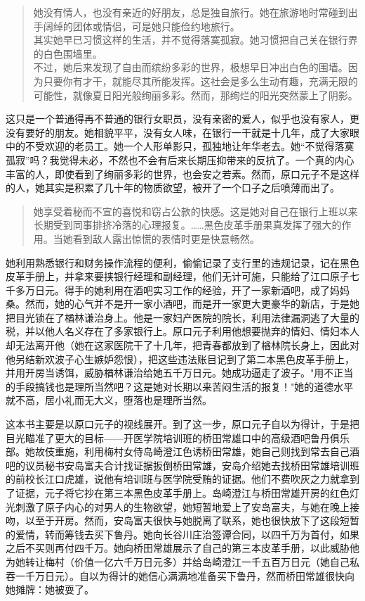\begin{quotation}
她没有情人，也没有亲近的好朋友，总是独自旅行。她在旅游地时常碰到出手阔绰的团体或情侣，可是她只能俭约地旅行。\\
其实她早已习惯这样的生活，并不觉得落寞孤寂。她习惯把自己关在银行界的白色围墙里。\\
不过，她后来发现了自由而缤纷多彩的世界，极想早日冲出白色的围墙。因为只要你有才干，就能尽其所能发挥。这社会是多么生动有趣，充满无限的可能性，就像夏日阳光般绚丽多彩。然而，那绚烂的阳光突然蒙上了阴影。
\end{quotation}

这只是一个普通得再不普通的银行女职员，没有亲密的爱人，似乎也没有家人，更没有要好的朋友。她相貌平平，没有女人味，在银行一干就是十几年，成了大家眼中的不受欢迎的老员工。她一个人形单影只，孤独地让年华老去。她“不觉得落寞孤寂”吗？我觉得未必，不然也不会有后来长期压抑带来的反抗了。一个真的内心丰富的人，即使看到了绚丽多彩的世界，也会安之若素。然而，原口元子不是这样的人，她其实是积累了几十年的物质欲望，被开了一个口子之后喷薄而出了。

\begin{quotation}
她享受着秘而不宣的喜悦和窃占公款的快感。这是她对自己在银行上班以来长期受到同事排挤冷落的心理报复。……黑色皮革手册果真发挥了强大的作用。当她看到敌人露出惊慌的表情时更是快意畅然。
\end{quotation}

她利用熟悉银行和财务操作流程的便利，偷偷记录了支行里的违规记录，记在黑色皮革手册上，并拿来要挟银行经理和副经理，他们无计可施，只能给了江口原子七千多万日元。得手的她利用在酒吧实习工作的经验，开了一家新酒吧，成了妈妈桑。然而，她的心气并不是开一家小酒吧，而是开一家更大更豪华的新店，于是她把目光锁在了楢林谦治身上。他是一家妇产医院的院长，利用法律漏洞逃了大量的税，并以他人名义存在了多家银行上。原口元子利用他想要抛弃的情妇、情妇本人却无法离开他（她在这家医院干了十几年，把青春都放到了楢林院长身上，因此对他另结新欢波子心生嫉妒怨恨），把这些违法账目记到了第二本黑色皮革手册上，并用开房当诱饵，威胁楢林谦治给她五千万日元。她成功逼走了波子。"用不正当的手段搞钱也是理所当然吧？这是她对长期以来苦闷生活的报复！"她的道德水平就不高，居小礼而无大义，堕落也是理所当然。

这本书主要是以原口元子的视线展开。到了这一步，原口元子自以为得计，于是把目光瞄准了更大的目标——开医学院培训班的桥田常雄口中的高级酒吧鲁丹俱乐部。她故伎重施，利用梅村女侍岛崎澄江色诱桥田常雄，她自己则找到常去自己酒吧的议员秘书安岛富夫合计找证据扳倒桥田常雄，安岛介绍她去找桥田常雄培训班的前校长江口虎雄，说他有培训班与医学院受贿的证据。他们不费吹灰之力就拿到了证据，元子将它抄在第三本黑色皮革手册上。岛崎澄江与桥田常雄开房的红色灯光刺激了原子内心的对男人的生物欲望，她短暂地爱上了安岛富夫，与她在晚上接吻，以至于开房。然而，安岛富夫很快与她脱离了联系，她也很快放下了这段短暂的爱情，转而筹钱去买下鲁丹。她向长谷川庄治签谭合同，以四千万为首付，如果之后不买则再付四千万。她向桥田常雄展示了自己的第三本皮革手册，以此威胁他为她转让梅村（价值一亿六千万日元多）并给岛崎澄江一千五百万日元（她自己私吞一千万日元）。自以为得计的她信心满满地准备买下鲁丹，然而桥田常雄很快向她摊牌：她被耍了。

